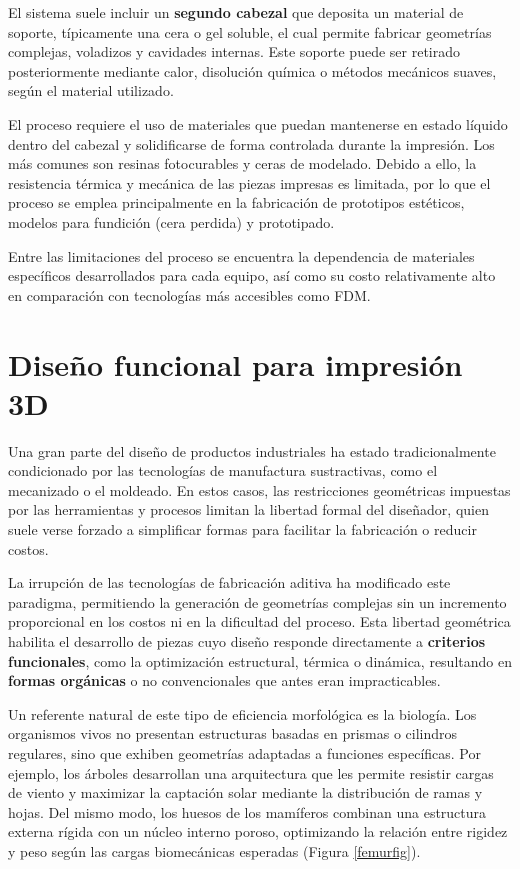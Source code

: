 El sistema suele incluir un \textbf{segundo cabezal} que deposita un material de soporte, típicamente una cera o gel soluble, el cual permite fabricar geometrías complejas, voladizos y cavidades internas. Este soporte puede ser retirado posteriormente mediante calor, disolución química o métodos mecánicos suaves, según el material utilizado.

El proceso requiere el uso de materiales que puedan mantenerse en estado líquido dentro del cabezal y solidificarse de forma controlada durante la impresión. Los más comunes son resinas fotocurables y ceras de modelado. Debido a ello, la resistencia térmica y mecánica de las piezas impresas es limitada, por lo que el proceso se emplea principalmente en la fabricación de prototipos estéticos, modelos para fundición (cera perdida) y prototipado.

Entre las limitaciones del proceso se encuentra la dependencia de materiales específicos desarrollados para cada equipo, así como su costo relativamente alto en comparación con tecnologías más accesibles como FDM. 

\section{Diseño funcional para impresión 3D}

Una gran parte del diseño de productos industriales ha estado tradicionalmente condicionado por las tecnologías de manufactura sustractivas, como el mecanizado o el moldeado. En estos casos, las restricciones geométricas impuestas por las herramientas y procesos limitan la libertad formal del diseñador, quien suele verse forzado a simplificar formas para facilitar la fabricación o reducir costos.

La irrupción de las tecnologías de fabricación aditiva ha modificado este paradigma, permitiendo la generación de geometrías complejas sin un incremento proporcional en los costos ni en la dificultad del proceso. Esta libertad geométrica habilita el desarrollo de piezas cuyo diseño responde directamente a \textbf{criterios funcionales}, como la optimización estructural, térmica o dinámica, resultando en \textbf{formas orgánicas} o no convencionales que antes eran impracticables.

Un referente natural de este tipo de eficiencia morfológica es la biología. Los organismos vivos no presentan estructuras basadas en prismas o cilindros regulares, sino que exhiben geometrías adaptadas a funciones específicas. Por ejemplo, los árboles desarrollan una arquitectura que les permite resistir cargas de viento y maximizar la captación solar mediante la distribución de ramas y hojas. Del mismo modo, los huesos de los mamíferos combinan una estructura externa rígida con un núcleo interno poroso, optimizando la relación entre rigidez y peso según las cargas biomecánicas esperadas (Figura \ref{femurfig}).

